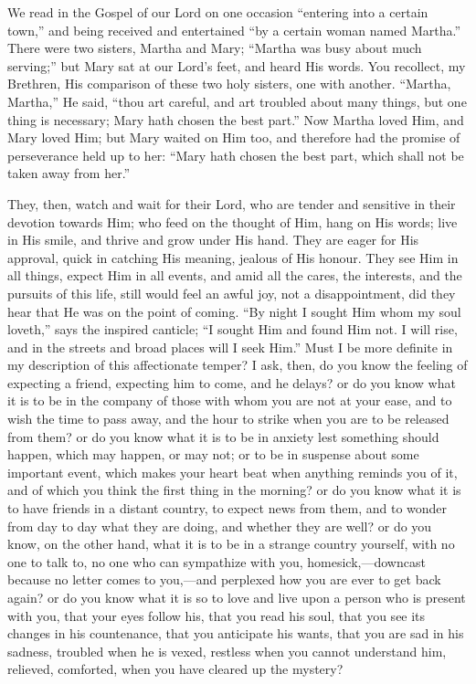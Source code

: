 We read in the Gospel of our Lord on one occasion
``entering into a certain town,'' and being
received and entertained ``by a certain woman named
Martha.'' There were two sisters, Martha and Mary;
``Martha was busy about much serving;'' but Mary
sat at our Lord's feet, and heard His words. You
recollect, my Brethren, His comparison of these two holy
sisters, one with another. ``Martha, Martha,'' He
said, ``thou art careful, and art troubled about many
things, but one thing is necessary; Mary hath chosen the
best part.'' Now Martha loved Him, and Mary loved
Him; but Mary waited on Him too, and therefore had the
promise of perseverance held up to her: ``Mary hath
chosen the best part, which shall not be taken away from
her.''

They, then, watch and wait for their Lord, who are
tender and sensitive in their devotion towards Him; who
feed on the thought of Him, hang on His words; live in
His smile, and thrive and grow under His hand. They are
eager for His approval, quick in catching His meaning,
jealous of His honour. They see Him in all things, expect
Him in all events, and amid all the cares, the interests,
and the pursuits of this life, still would feel an awful
joy, not a disappointment, did they hear that He was on
the point of coming. ``By night I sought Him whom my
soul loveth,'' says the inspired canticle; ``I
sought Him and found Him not. I will rise, and in the
streets and broad places will I seek Him.'' Must I be
more definite in my description of this affectionate
temper? I ask, then, do you know the feeling of expecting
a friend, expecting him to come, and he delays? or do you
know what it is to be in the company of those with whom
you are not at your ease, and to wish the time to pass
away, and the hour to strike when you are to be released
from them? or do you know what it is to be in anxiety
lest something should happen, which may happen, or may
not; or to be in suspense about some important event,
which makes your heart beat when anything reminds you of
it, and of which you think the first thing in the
morning? or do you know what it is to have friends in a
distant country, to expect news from them, and to wonder
from day to day what they are doing, and whether they are
well? or do you know, on the other hand, what it is to be
in a strange country yourself, with no one to talk to, no
one who can sympathize with you, homesick,—downcast
because no letter comes to you,—and perplexed how
you are ever to get back again? or do you know what it is
so to love and live upon a person who is present with
you, that your eyes follow his, that you read his soul,
that you see its changes in his countenance, that you
anticipate his wants, that you are sad in his sadness,
troubled when he is vexed, restless when you cannot
understand him, relieved, comforted, when you have
cleared up the mystery?

